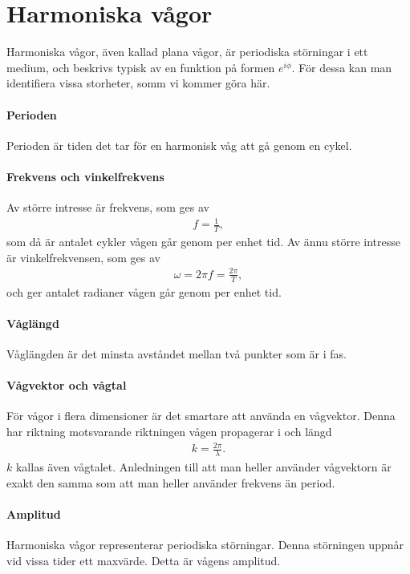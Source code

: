 \section{Harmoniska vågor}
Harmoniska vågor, även kallad plana vågor, är periodiska störningar i ett medium, och beskrivs typisk av en funktion på formen $e^{i\phi}$. För dessa kan man identifiera vissa storheter, somm vi kommer göra här.

\paragraph{Perioden}
Perioden är tiden det tar för en harmonisk våg att gå genom en cykel.

\paragraph{Frekvens och vinkelfrekvens}
Av större intresse är frekvens, som ges av
\begin{align*}
	f = \frac{1}{T},
\end{align*}
som då är antalet cykler vågen går genom per enhet tid. Av ännu större intresse är vinkelfrekvensen, som ges av
\begin{align*}
	\omega = 2\pi f = \frac{2\pi}{T},
\end{align*}
och ger antalet radianer vågen går genom per enhet tid.

\paragraph{Våglängd}
Våglängden är det minsta avståndet mellan två punkter som är i fas.

\paragraph{Vågvektor och vågtal}
För vågor i flera dimensioner är det smartare att använda en vågvektor. Denna har riktning motsvarande riktningen vågen propagerar i och längd
\begin{align*}
	k = \frac{2\pi}{\lambda}.
\end{align*}
$k$ kallas även vågtalet. Anledningen till att man heller använder vågvektorn är exakt den samma som att man heller använder frekvens än period.

\paragraph{Amplitud}
Harmoniska vågor representerar periodiska störningar. Denna störningen uppnår vid vissa tider ett maxvärde. Detta är vågens amplitud.